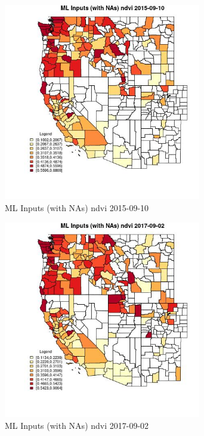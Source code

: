 \begin{figure} 
\centering  
\includegraphics[width=0.77\textwidth]{Code_Outputs/Report_ML_input_PM25_Step4_part_e_de_duplicated_aves_compiled_2019-05-21wNAs_CountyndviMean2015-09-10.jpg} 
\caption{\label{fig:Report_ML_input_PM25_Step4_part_e_de_duplicated_aves_compiled_2019-05-21wNAsCountyndviMean2015-09-10}ML Inputs (with NAs) ndvi 2015-09-10} 
\end{figure} 
 

\begin{figure} 
\centering  
\includegraphics[width=0.77\textwidth]{Code_Outputs/Report_ML_input_PM25_Step4_part_e_de_duplicated_aves_compiled_2019-05-21wNAs_CountyndviMean2017-09-02.jpg} 
\caption{\label{fig:Report_ML_input_PM25_Step4_part_e_de_duplicated_aves_compiled_2019-05-21wNAsCountyndviMean2017-09-02}ML Inputs (with NAs) ndvi 2017-09-02} 
\end{figure} 
 


